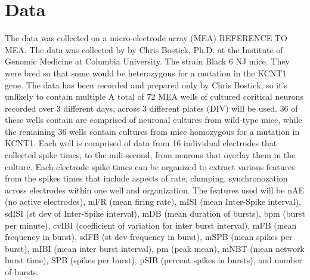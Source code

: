 \documentclass{article}\usepackage[]{graphicx}\usepackage[]{color}
\begin{document}
\section*{Data}
The data was collected on a micro-electrode array (MEA) REFERENCE TO MEA. The data was collected by by Chris Bostick, Ph.D. at the Institute of Genomic Medicine at Columbia University. The strain Black 6 NJ mice. They were bred so that some would be heterozygous for a mutation in the KCNT1 gene. The data has been recorded and prepared only by Chris Bostick, so it's unlikely to contain multiple A total of 72 MEA wells of cultured coritical neurons recorded over 3 different days, across 3 different plates (DIV) will be used. 36 of these wells contain are comprised of neuronal cultures from wild-type mice, while the remaining 36 wells contain cultures from mice homozygous for a mutation in KCNT1. Each well is comprised of data from 16 individual electrodes that collected spike times, to the mili-second, from neurons that overlay them in the culture. Each electrode spike times can be organized to extract various features from the spikes times that include aspects of rate, clumping, synchronozation across electrodes within one well and organization.  The features used will be nAE (no active electrodes), mFR (mean firing rate), mISI (mean Inter-Spike interval), sdISI (st dev of Inter-Spike interval), mDB (mean duration of bursts), bpm (burst per minute), cvIBI (coefficient of variation for inter burst interval), mFB (mean frequency in burst), sdFB (st dev frequency in burst), mSPB (mean spikes per burst), mIBI (mean inter burst interval), pm (peak mean), mNBT (mean network burst time), SPB (spikes per burst), pSIB (percent spikes in bursts), and number of bursts.
\end{document}
